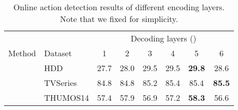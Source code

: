 \documentclass[10pt,twocolumn,letterpaper]{article}
\newcommand{\tablestyle}[2]{\setlength{\tabcolsep}{#1}\renewcommand{\arraystretch}{#2}\centering\footnotesize}
\begin{document}
{\begin{table}[t]
\begin{subtable}[t]{\linewidth}
\begin{tabular}
    \end{tabular}
    \vspace{-3pt}
    \caption{
        Online action detection results of different encoding layers. Note that we fixed  for simplicity. 
    }
    \vspace{+3pt}
\end{subtable}
\begin{subtable}[t]{\linewidth}
        \centering
\tablestyle{4pt}{1.05}
\begin{tabular}
        {@{\;\;}l@{\;\;}@{\;\;}|l@{\;\;}@{\;\;}c@{\;\;}@{\;\;}c@{\;\;}@{\;\;}c@{\;\;}@{\;\;}c@{\;\;}@{\;\;}c@{\;\;}@{\;\;}c}
& & \multicolumn{6}{c}{Decoding layers ()}\\
\cline{3-8}
        Method & Dataset & 1 & 2 & 3 & 4 & 5 & 6 \\
\shline
        \multirow{3}{*}{OadTR}
        & {HDD}   & 27.7 & 28.0 & 29.5 & 29.5 & \bf{29.8} & 28.6 \\ & {TVSeries}   & 84.8 & 84.8 & 85.2 & 85.4 & 85.4 & \bf{85.5} \\ & {THUMOS14}   & 57.4 & 57.9 & 56.9 & 57.2 & \bf{58.3} & 56.6 \\



\end{tabular}
\end{subtable}
\end{table}}
\end{document}
